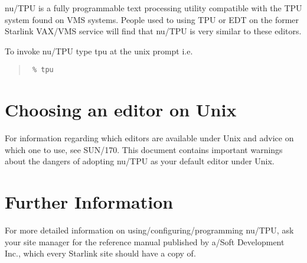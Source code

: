 nu/TPU is a fully programmable text processing utility compatible 
with the TPU system found on VMS systems. People used to using
TPU or EDT on the former Starlink VAX/VMS service will find that
nu/TPU is very similar to these editors.

To invoke nu/TPU type tpu at the unix prompt i.e.

\begin{quote}\tt
\% tpu
\end{quote}

\section{Choosing an editor on Unix}

For information regarding which editors are available under Unix and
advice on which one to use, see SUN/170. This document contains
important warnings about the dangers of adopting nu/TPU as your default
editor under Unix.

\section{Further Information}

For more detailed information on using/configuring/programming nu/TPU,
ask your site manager for the reference manual published by a/Soft 
Development Inc., which every Starlink site should have a copy of.


